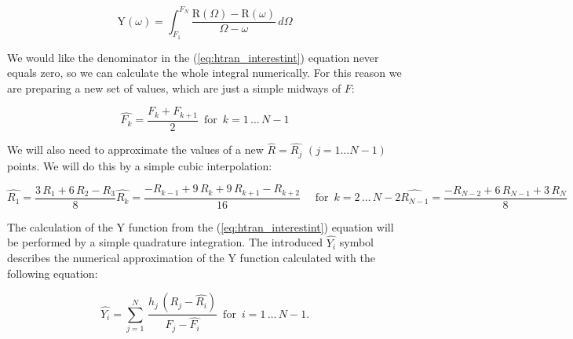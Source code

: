 \documentclass[12pt,twoside,a4paper]{article}
\numberwithin{equation}{subsection}
\numberwithin{figure}{subsection}
\begin{document}
\begin{equation} \label{eq:htran_interestint} 
  \mathrm{Y}(\omega ) = \int_{F_1}^{F_N} \frac { \mathrm{R}(\Omega ) - \mathrm{R}( \omega )}{\Omega  - \omega } \, d\Omega
\end{equation}


We would like the denominator in the (\ref{eq:htran_interestint}) equation never equals zero, so we can calculate the whole integral numerically. For this reason we are preparing a new set of values, which are just a simple midways of $F$:

\begin{equation} \label{eq:htran_newpoints}
  \widehat{F_k}=\frac { F_k + F_{k + 1} }{2} \,\mbox{ for } \, k = 1 \, \ldots \, {N - 1}
\end{equation} 

We will also need to approximate the values of a new $\widehat{R} = \widehat{R_j}$ $(j = 1 \ldots N-1)$  points. We will do this by a simple cubic interpolation:

\begin{subequations} \label{eq:htran_r3interp}
  \begin{equation}   \label{eq:hr3inp_first}
    \widehat{R_1}     = \frac {3 \, R_1 + 6 \, R_2 - R_3}{8}
  \end{equation}
  \begin{equation}   \label{eq:hr3inp_next}
    \widehat{R_k}     = \frac { - R_{k - 1} + 9 \, R_k + 9 \, R_{k + 1} - R_{k + 2} }{16} 
                        \quad \mbox{ for } \, k = 2 \, \ldots \, {N - 2}
  \end{equation}
  \begin{equation}   \label{eq:hr3inp_last}
    \widehat{R_{N-1}} = \frac { - R_{N - 2} + 6 \, R_{N - 1} + 3 \, R_N}{8}
  \end{equation}
\end{subequations}

The calculation of the $\mathrm{Y}$ function from the (\ref{eq:htran_interestint}) equation will be performed by a simple quadrature integration. The introduced $\widehat{Y_{i}}$ symbol describes the numerical approximation of the $\mathrm{Y}$ function calculated with the following equation:

\begin{equation} \label{eq:htran_simplequadrature}
  \widehat{Y_{i}} = \sum_{j=1}^{N} \, \frac {h_j \, (R_j - \widehat{R_i})} 
                                            {F_j - \widehat{F_i}} \, \mbox{ for } \, i = 1 \, \ldots \, {N - 1} .
\end{equation}
\end{document}
